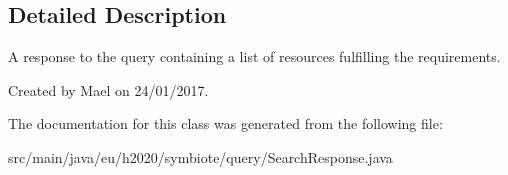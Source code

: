 \subsection{Detailed Description}
A response to the query containing a list of resources fulfilling the requirements.

Created by Mael on 24/01/2017. 

The documentation for this class was generated from the following file\+:\begin{DoxyCompactItemize}
\item 
src/main/java/eu/h2020/symbiote/query/Search\+Response.\+java\end{DoxyCompactItemize}
